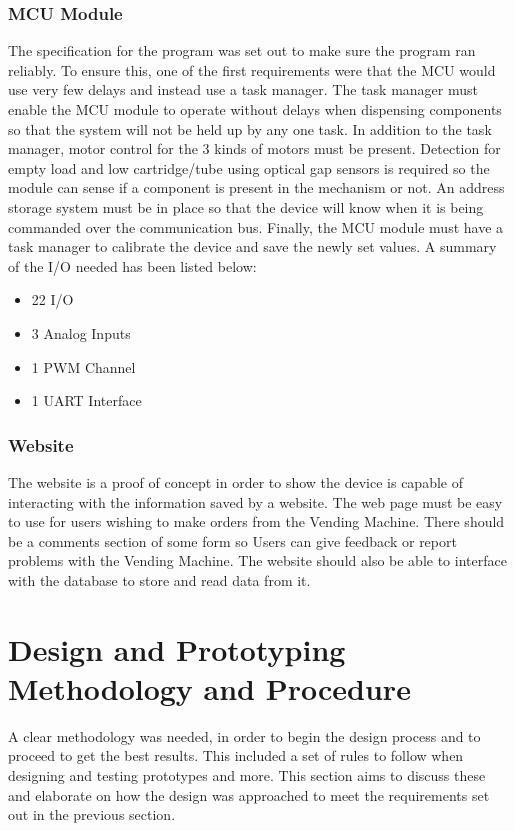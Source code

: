 \documentclass[a4paper,11pt]{article}
\numberwithin{figure}{section}
\numberwithin{table}{section}
\begin{document}
\subsubsection{MCU Module}
\label{subsec:mcuspec}
The specification for the program was set out to make sure the program ran reliably. To ensure this, one of the first requirements were that the MCU would use very few delays and instead use a task manager. The task manager must enable the MCU module to operate without delays when dispensing components so that the system will not be held up by any one task. In addition to the task manager, motor control for the 3 kinds of motors must be present. Detection for empty load and low cartridge/tube using optical gap sensors is required so the module can sense if a component is present in the mechanism or not. An address storage system must be in place so that the device will know when it is being commanded over the communication bus. Finally, the MCU module must have a task manager to calibrate the device and save the newly set values. A summary of the I/O needed has been listed below:
	
	\begin{itemize}
	\setlength\itemsep{0em}
	\item 22 I/O
	\item 3 Analog Inputs
	\item 1 PWM Channel
	\item 1 UART Interface		
	\end{itemize}
	
\subsubsection{Website}
The website is a proof of concept in order to show the device is capable of interacting with the information saved by a website. The web page must be easy to use for users wishing to make orders from the Vending Machine. There should be a comments section of some form so Users can give feedback or report problems with the Vending Machine. The website should also be able to interface with the database to store and read data from it.

\newpage
\section[Design and Prototyping Methodology and Procedure]{Design and Prototyping Methodology and Procedure%
}
A clear methodology was needed, in order to begin the design process and to proceed to get the best results. This included a set of rules to follow when designing and testing prototypes and more. This section aims to discuss these and elaborate on how the design was approached to meet the requirements set out in the previous section.
\end{document}
